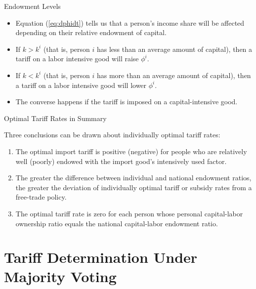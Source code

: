 \documentclass[aspectratio=169]{beamer}
\begin{document}

\begin{frame}{Endowment Levels}

\begin{itemize}
    \item<1-> Equation (\ref{eq:dphidt}) tells us that a person’s income share will be affected depending on their relative endowment of capital.
    \item<2-> If $ k > k^{i} $ (that is, person $ i $ has less than an average amount of capital), then a tariff on a labor intensive good will raise $ \phi^{i} $.
    \item<3-> If $ k < k^{i} $ (that is, person $ i $ has more than an average amount of capital), then a tariff on a labor intensive good will lower $ \phi^{i} $.
    \item<4-> The converse happens if the tariff is imposed on a capital-intensive good.
\end{itemize}
    
\end{frame}


\begin{frame}{Optimal Tariff Rates in Summary}

Three conclusions can be drawn about individually optimal tariff rates:

\begin{enumerate}
    \item<1-> The optimal import tariff is positive (negative) for people who are relatively well (poorly) endowed with the import good’s intensively used factor.
    \item<2-> The greater the difference between individual and national endowment ratios, the greater the deviation of individually optimal tariff or subsidy rates from a free-trade policy.
    \item<3-> The optimal tariff rate is zero for each person whose personal capital-labor ownership ratio equals the national capital-labor endowment ratio.
\end{enumerate}
    
\end{frame}


\section{Tariff Determination Under Majority Voting}
\end{document}
